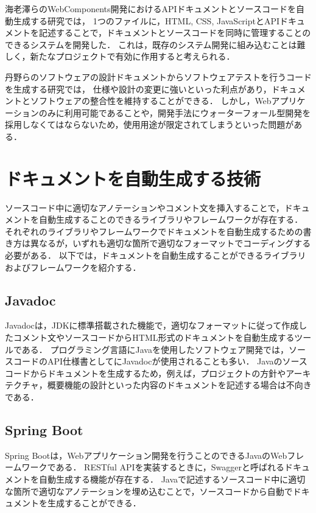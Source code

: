 海老澤らのWebComponents開発におけるAPIドキュメントとソースコードを自動生成する研究\cite{webcomponents}では，
1つのファイルに，HTML, CSS, JavaScriptとAPIドキュメントを記述することで，ドキュメントとソースコードを同時に管理することのできるシステムを開発した．
これは，既存のシステム開発に組み込むことは難しく，新たなプロジェクトで有効に作用すると考えられる．

丹野らのソフトウェアの設計ドキュメントからソフトウェアテストを行うコードを生成する研究\cite{test}では，
仕様や設計の変更に強いといった利点があり，ドキュメントとソフトウェアの整合性を維持することができる．
しかし，Webアプリケーションのみに利用可能であることや，開発手法にウォーターフォール型開発を採用しなくてはならないため，使用用途が限定されてしまうといった問題がある．

\section{ドキュメントを自動生成する技術}
ソースコード中に適切なアノテーションやコメント文を挿入することで，ドキュメントを自動生成することのできるライブラリやフレームワークが存在する．
それぞれのライブラリやフレームワークでドキュメントを自動生成するための書き方は異なるが，いずれも適切な箇所で適切なフォーマットでコーディングする必要がある．
以下では，ドキュメントを自動生成することができるライブラリおよびフレームワークを紹介する．

\subsection{Javadoc}
Javadoc\cite{javadoc}は，JDKに標準搭載された機能で，適切なフォーマットに従って作成したコメント文やソースコードからHTML形式のドキュメントを自動生成するツールである．
プログラミング言語にJavaを使用したソフトウェア開発では，ソースコードのAPI仕様書としてにJavadocが使用されることも多い．
Javaのソースコードからドキュメントを生成するため，例えば，プロジェクトの方針やアーキテクチャ，概要機能の設計といった内容のドキュメントを記述する場合は不向きである．

\subsection{Spring Boot}
Spring Boot\cite{spring}は，Webアプリケーション開発を行うことのできるJavaのWebフレームワークである．
RESTful APIを実装するときに，Swagger\cite{swagger}と呼ばれるドキュメントを自動生成する機能が存在する．
Javaで記述するソースコード中に適切な箇所で適切なアノテーションを埋め込むことで，ソースコードから自動でドキュメントを生成することができる．

